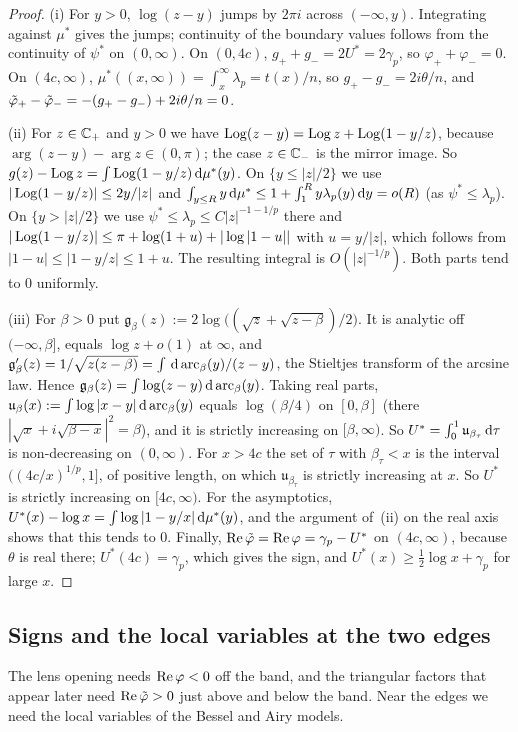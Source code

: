 \begin{proof}
(i) For $y>0$, $\log(z-y)$ jumps by $2\pi i$ across $(-\infty,y)$. Integrating against $\mu^*$ gives the jumps;
continuity of the boundary values follows from the continuity of $\psi^*$ on $(0,\infty)$. On $(0,4c)$,
$g_++g_-=2U^*=2\gamma_p$, so $\varphi_++\varphi_-=0$. On $(4c,\infty)$, $\mu^*((x,\infty))=\int_x^\infty\lambda_p=
t(x)/n$, so $g_+-g_-=2i\theta/n$, and $\tilde\varphi_+-\tilde\varphi_-=-(g_+-g_-)+2i\theta/n=0$.

(ii) For $z\in\mathbb{C}_+$ and $y>0$ we have $\operatorname{Log}(z-y)=\operatorname{Log} z+\operatorname{Log}(1-y/z)$, because $\arg(z-y)-\arg z\in(0,\pi)$; the
case $z\in\mathbb{C}_-$ is the mirror image. So $g(z)-\operatorname{Log} z=\int\operatorname{Log}(1-y/z)\,\mathrm{d}\mu^*(y)$. On $\{y\le|z|/2\}$ we use
$|\operatorname{Log}(1-y/z)|\le2y/|z|$ and $\int_{y\le R}y\,\mathrm{d}\mu^*\le1+\int_1^Ry\lambda_p(y)\,\mathrm{d} y=o(R)$ (as $\psi^*\le\lambda_p$). On
$\{y>|z|/2\}$ we use $\psi^*\le\lambda_p\le C|z|^{-1-1/p}$ there and
$|\operatorname{Log}(1-y/z)|\le\pi+\log(1+u)+|\log|1-u||$ with $u=y/|z|$, which follows from
$|1-u|\le|1-y/z|\le1+u$. The resulting integral is $O(|z|^{-1/p})$. Both parts tend to $0$ uniformly.

(iii) For $\beta>0$ put $\mathfrak g_\beta(z):=2\log\bigl((\sqrt z+\sqrt{z-\beta})/2\bigr)$. It is analytic off
$(-\infty,\beta]$, equals $\log z+o(1)$ at $\infty$, and $\mathfrak g_\beta'(z)=1/\sqrt{z(z-\beta)}=\int\,\mathrm{d}\,
\mathrm{arc}_\beta(y)/(z-y)$, the Stieltjes transform of the arcsine law. Hence $\mathfrak g_\beta(z)=\int\log(z-y)\,\mathrm{d}\,
\mathrm{arc}_\beta(y)$. Taking real parts, $\mathfrak u_\beta(x):=\int\log|x-y|\,\mathrm{d}\,\mathrm{arc}_\beta(y)$ equals
$\log(\beta/4)$ on $[0,\beta]$ (there $|\sqrt x+i\sqrt{\beta-x}|^2=\beta$), and it is strictly increasing on
$[\beta,\infty)$. So $U^*=\int_0^1\mathfrak u_{\beta_\tau}\,\mathrm{d}\tau$ is non-decreasing on $(0,\infty)$. For $x>4c$ the
set of $\tau$ with $\beta_\tau<x$ is the interval $((4c/x)^{1/p},1]$, of positive length, on which
$\mathfrak u_{\beta_\tau}$ is strictly increasing at $x$. So $U^*$ is strictly increasing on $[4c,\infty)$. For the
asymptotics, $U^*(x)-\log x=\int\log|1-y/x|\,\mathrm{d}\mu^*(y)$, and the argument of~(ii) on the real axis shows that this
tends to $0$. Finally, $\operatorname{Re}\tilde\varphi=\operatorname{Re}\varphi=\gamma_p-U^*$ on $(4c,\infty)$, because $\theta$ is real there;
$U^*(4c)=\gamma_p$, which gives the sign, and $U^*(x)\ge\frac12\log x+\gamma_p$ for large $x$.
\end{proof}

\subsection{Signs and the local variables at the two edges}\label{sec:frame-signs}
The lens opening needs $\operatorname{Re}\varphi<0$ off the band, and the triangular factors that appear later need
$\operatorname{Re}\tilde\varphi>0$ just above and below the band. Near the edges we need the local variables of the Bessel and Airy
models.


